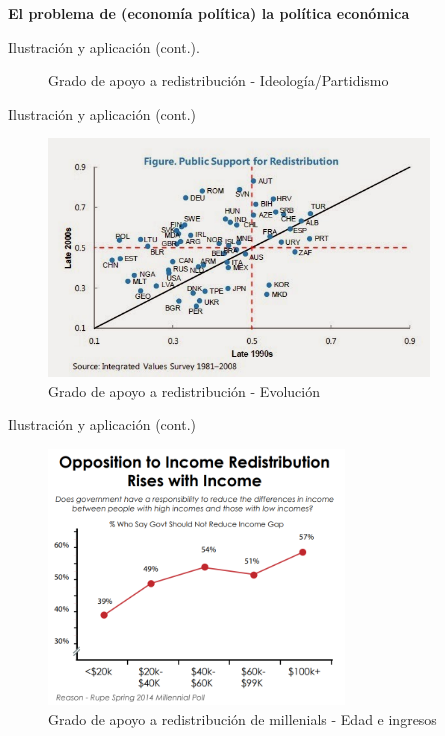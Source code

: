 \documentclass[
  ignorenonframetext,
]{beamer}
\begin{document}
\begin{frame}{\textbf{El problema de (economía política) la política
económica}}
\begin{block}{Ilustración y aplicación (cont.).}
\begin{figure}
{}

\caption{Grado de apoyo a redistribución - Ideología/Partidismo}

\end{figure}
\end{block}

\begin{block}{Ilustración y aplicación (cont.)}
\protect\hypertarget{ilustraciuxf3n-y-aplicaciuxf3n-cont.}{}
\begin{figure}

{\centering \includegraphics[width=0.9\textwidth,height=\textheight]{../epol/fig/fig-02-002.jpg}

}

\caption{Grado de apoyo a redistribución - Evolución}

\end{figure}
\end{block}

\begin{block}{Ilustración y aplicación (cont.)}
\protect\hypertarget{ilustraciuxf3n-y-aplicaciuxf3n-cont.-1}{}
\begin{figure}

{\centering \includegraphics[width=0.7\textwidth,height=\textheight]{../epol/fig/fig-02-003.png}

}

\caption{Grado de apoyo a redistribución de millenials - Edad e
ingresos}

\end{figure}
\end{block}
\end{frame}
\end{document}
